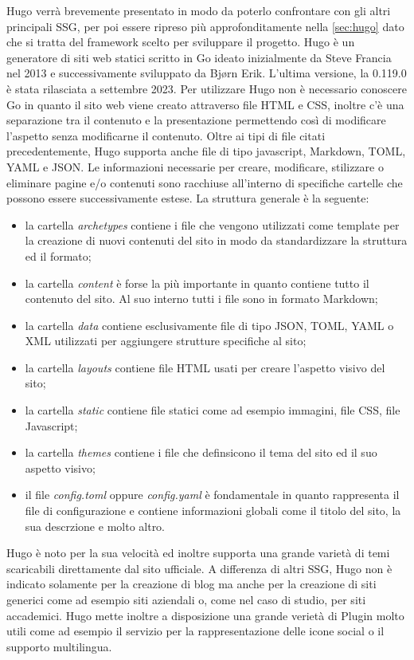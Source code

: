 \documentclass[target=bach,aauheader=]{thud}
\begin{document}
Hugo verrà brevemente presentato in modo da poterlo confrontare con gli altri principali SSG, per poi essere ripreso più approfonditamente nella \cref{sec:hugo} dato che si tratta del framework scelto per sviluppare il progetto. \newline
Hugo è un generatore di siti web statici scritto in Go ideato inizialmente da Steve Francia nel 2013 e successivamente sviluppato da Bjørn Erik. L'ultima versione, la 0.119.0 è stata rilasciata a settembre 2023.
Per utilizzare Hugo non è necessario conoscere Go in quanto il sito web viene creato attraverso file HTML e CSS, inoltre c'è una separazione tra il contenuto e la presentazione permettendo così di modificare l'aspetto senza modificarne il contenuto. 
Oltre ai tipi di file citati precedentemente, Hugo supporta anche file di tipo javascript, Markdown, TOML, YAML e JSON. \newline
Le informazioni necessarie per creare, modificare, stilizzare o eliminare pagine e/o contenuti sono racchiuse all'interno di specifiche cartelle che possono essere successivamente estese. La struttura generale è la seguente:
\begin{itemize}
    \item la cartella \textit{archetypes} contiene i file che vengono utilizzati come template per la creazione di nuovi contenuti del sito in modo da standardizzare la struttura ed il formato;
    \item la cartella \textit{content} è forse la più importante in quanto contiene tutto il contenuto del sito. Al suo interno tutti i file sono in formato Markdown;
    \item la cartella \textit{data} contiene esclusivamente file di tipo JSON, TOML, YAML o XML utilizzati per aggiungere strutture specifiche al sito;
    \item la cartella \textit{layouts} contiene file HTML usati per creare l'aspetto visivo del sito;
    \item la cartella \textit{static} contiene file statici come ad esempio immagini, file CSS, file Javascript;
    \item la cartella \textit{themes} contiene i file che definsicono il tema del sito ed il suo aspetto visivo;
    \item il file \textit{config.toml} oppure \textit{config.yaml} è fondamentale in quanto rappresenta il file di configurazione e contiene informazioni globali come il titolo del sito, la sua descrzione e molto altro.
\end{itemize}
Hugo è noto per la sua velocità ed inoltre supporta una grande varietà di temi scaricabili direttamente dal sito ufficiale. A differenza di altri SSG, Hugo non è indicato solamente per la creazione di blog
ma anche per la creazione di siti generici come ad esempio siti aziendali o, come nel caso di studio, per siti accademici. 
Hugo mette inoltre a disposizione una grande verietà di Plugin molto utili come ad esempio il servizio per la rappresentazione delle icone social o il supporto multilingua. 
\end{document}
